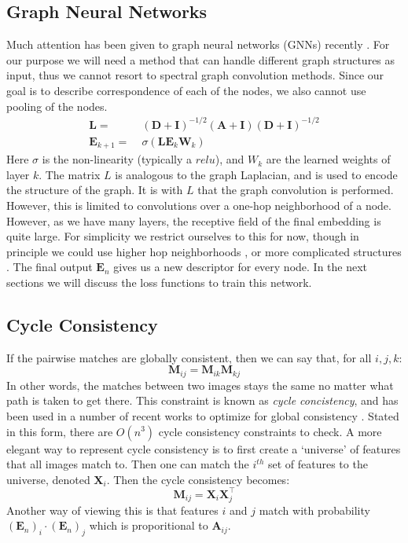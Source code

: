 \documentclass[10pt,twocolumn,letterpaper]{article}
\newcommand{\mat}[1]{\mathbf{#1}}
\begin{document}
\subsection{Graph Neural Networks}
Much attention has been given to graph neural networks (GNNs) recently
\cite{bronstein2017geometric, bruna2013spectral, defferrard2016convolutional, kipf2016semi, scarselli2009graph, gama2018mimo, gama2018convolutional, battaglia2018relational}.
For our purpose we will need a method that can handle different graph structures as input, thus we cannot resort to spectral graph convolution methods.
Since our goal is to describe correspondence of each of the nodes, we also cannot use pooling of the nodes.
\begin{align}
      \mat{L} =&\; (\mat{D} + \mat{I})^{-1/2} (\mat{A} + \mat{I}) (\mat{D} + \mat{I})^{-1/2} \\
\mat{E}_{k+1} =&\; \sigma\left(\mat{L} \mat{E}_k \mat{W}_k \right)
\end{align}
Here $\sigma$ is the non-linearity (typically a $relu$), and $W_k$ are the learned weights of layer $k$. 
The matrix $L$ is analogous to the graph Laplacian, and is used to encode the structure of the graph.
It is with $L$ that the graph convolution is performed.
However, this is limited to convolutions over a one-hop neighborhood of a node.
However, as we have many layers, the receptive field of the final embedding is quite large.
For simplicity we restrict ourselves to this for now, though in principle we could use higher hop neighborhoods \cite{gama2018convolutional}, or more complicated structures \cite{battaglia2018relational}.
The final output $\mat{E}_n$ gives us a new descriptor for every node.
In the next sections we will discuss the loss functions to train this network.

\subsection{Cycle Consistency}
If the pairwise matches are globally consistent, then we can say that, for all $i, j, k$:
\begin{equation}
\mat{M}_{ij} = \mat{M}_{ik} \mat{M}_{kj}
\label{eq:cycconsist1}
\end{equation}
In other words, the matches between two images stays the same no matter what path is taken to get there. 
This constraint is known as \textit{cycle concistency}, and has been used in a number of recent works to optimize for global consistency \cite{zhou2015multi, wang2017multi, leonardos2016distributed}.
Stated in this form, there are $O(n^3)$ cycle consistency constraints to check.
A more elegant way to represent cycle consistency is to first create a `universe' of features that all images match to.
Then one can match the $i^{th}$ set of features to the universe, denoted $\mat{X}_i$.
Then the cycle consistency becomes:
\begin{equation}
\mat{M}_{ij} = \mat{X}_{i}\mat{X}_{j}^\top
\label{eq:cycconsist2}
\end{equation}
Another way of viewing this is that features $i$ and $j$ match with probability $(\mat{E}_n)_i \cdot (\mat{E}_n)_j$ which is proporitional to $\mat{A}_{ij}$.
\end{document}
